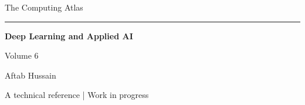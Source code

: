 \documentclass[11pt,oneside,openany]{book}
\begin{document}
\frontmatter
\begin{titlepage}
\centering
\vspace*{3.7cm}
{\Large The Computing Atlas\par}
\vspace{0.65cm}
\rule{0.6\textwidth}{0.5pt}\par
\vspace{0.75cm}
{\Huge\bfseries Deep Learning and Applied AI\par}
\vspace{1.0cm}
{\large Volume 6\par}
\vfill
{\large Aftab Hussain\par}
\vspace{0.6cm}
{\small A technical reference | Work in progress\par}
\vspace{1.2cm}
\end{titlepage}
\tableofcontents
\mainmatter

\end{document}
